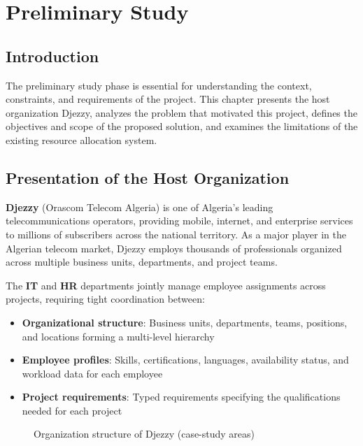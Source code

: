 \documentclass{bts-report}
\begin{document}
\chapter{Preliminary Study}

\section*{Introduction}
The preliminary study phase is essential for understanding the context, constraints, and requirements of the project. This chapter presents the host organization Djezzy, analyzes the problem that motivated this project, defines the objectives and scope of the proposed solution, and examines the limitations of the existing resource allocation system.

\section{Presentation of the Host Organization}

\textbf{Djezzy} (Orascom Telecom Algeria) is one of Algeria's leading telecommunications operators, providing mobile, internet, and enterprise services to millions of subscribers across the national territory. As a major player in the Algerian telecom market, Djezzy employs thousands of professionals organized across multiple business units, departments, and project teams.

The \textbf{IT} and \textbf{HR} departments jointly manage employee assignments across projects, requiring tight coordination between:
\begin{itemize}
  \item \textbf{Organizational structure}: Business units, departments, teams, positions, and locations forming a multi-level hierarchy
  \item \textbf{Employee profiles}: Skills, certifications, languages, availability status, and workload data for each employee
  \item \textbf{Project requirements}: Typed requirements specifying the qualifications needed for each project
\end{itemize}

\begin{figure}[htbp]
  \centering
  \resizebox{\textwidth}{!}{}
  \caption{Organization structure of Djezzy (case-study areas)}
  \label{fig:org-chart}
\end{figure}
\end{document}
